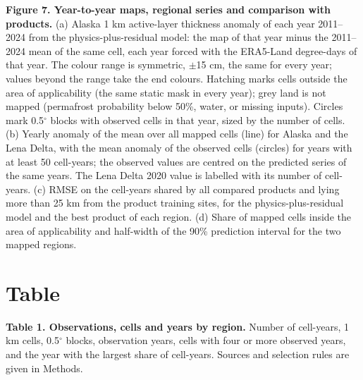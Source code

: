\textbf{Figure 7. Year-to-year maps, regional series and comparison with products.} (a) Alaska 1 km active-layer thickness anomaly of each year 2011--2024 from the physics-plus-residual model: the map of that year minus the 2011--2024 mean of the same cell, each year forced with the ERA5-Land degree-days of that year. The colour range is symmetric, $\pm$15 cm, the same for every year; values beyond the range take the end colours. Hatching marks cells outside the area of applicability (the same static mask in every year); grey land is not mapped (permafrost probability below 50\%, water, or missing inputs). Circles mark 0.5$^\circ$ blocks with observed cells in that year, sized by the number of cells. (b) Yearly anomaly of the mean over all mapped cells (line) for Alaska and the Lena Delta, with the mean anomaly of the observed cells (circles) for years with at least 50 cell-years; the observed values are centred on the predicted series of the same years. The Lena Delta 2020 value is labelled with its number of cell-years. (c) RMSE on the cell-years shared by all compared products and lying more than 25 km from the product training sites, for the physics-plus-residual model and the best product of each region. (d) Share of mapped cells inside the area of applicability and half-width of the 90\% prediction interval for the two mapped regions.

\section*{Table}

\textbf{Table 1. Observations, cells and years by region.} Number of cell-years, 1 km cells, 0.5$^\circ$ blocks, observation years, cells with four or more observed years, and the year with the largest share of cell-years. Sources and selection rules are given in Methods.

